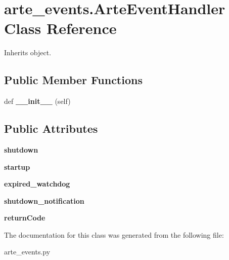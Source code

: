 \section{arte\+\_\+events.\+Arte\+Event\+Handler Class Reference}
\label{classarte__events_1_1_arte_event_handler}


Inherits object.

\subsection*{Public Member Functions}
\begin{DoxyCompactItemize}
\item 
def {\bfseries \+\_\+\+\_\+init\+\_\+\+\_\+} (self)\label{classarte__events_1_1_arte_event_handler_af535e4b9e54118d42a007c8a94722b48}

\end{DoxyCompactItemize}
\subsection*{Public Attributes}
\begin{DoxyCompactItemize}
\item 
{\bfseries shutdown}\label{classarte__events_1_1_arte_event_handler_a4279bcd17863d20613c8fa861f882845}

\item 
{\bfseries startup}\label{classarte__events_1_1_arte_event_handler_a05bee1005609e7a70c28962b7baed13f}

\item 
{\bfseries expired\+\_\+watchdog}\label{classarte__events_1_1_arte_event_handler_ae90e4f227876937bc6a4532e61cb3818}

\item 
{\bfseries shutdown\+\_\+notification}\label{classarte__events_1_1_arte_event_handler_a700abfec6c03df636eb76be12d92c2c1}

\item 
{\bfseries return\+Code}\label{classarte__events_1_1_arte_event_handler_a0f2b65658b2c24816140c085d2f749d0}

\end{DoxyCompactItemize}


The documentation for this class was generated from the following file\+:\begin{DoxyCompactItemize}
\item 
arte\+\_\+events.\+py\end{DoxyCompactItemize}
